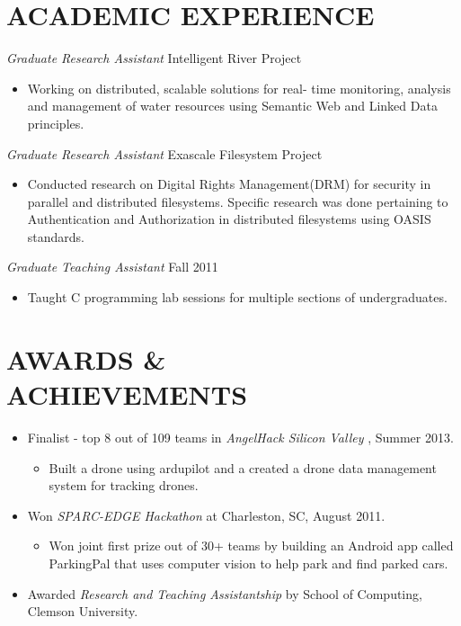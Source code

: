 \documentclass[line,margin]{res}
\begin{document}
\begin{resume}
\section{ACADEMIC EXPERIENCE}  {\sl Graduate Research Assistant} \hfill        Intelligent River\textsuperscript{\textregistered} Project
 					\begin{itemize}  \itemsep -2pt
 					\item Working on distributed, scalable solutions for real- time monitoring, analysis and management of water resources using Semantic Web and Linked Data principles.
					\end{itemize}
					
					{\sl Graduate Research Assistant} \hfill        Exascale Filesystem Project
 					\begin{itemize}  \itemsep -2pt
 					\item Conducted research on Digital Rights Management(DRM) for security in parallel and distributed filesystems. Specific research was done pertaining to Authentication and Authorization in distributed filesystems using OASIS standards.
					\end{itemize}

				  {\sl Graduate Teaching Assistant} \hfill        Fall 2011
 					\begin{itemize}  \itemsep -2pt
 					\item Taught C programming lab sessions for multiple sections of undergraduates.
					\end{itemize}
					

\section{AWARDS \& \\ ACHIEVEMENTS}
			\begin{itemize}  \itemsep -2pt             
            \item Finalist - top 8 out of 109 teams in {\it AngelHack Silicon Valley} , Summer 2013.
            \begin{itemize}  \itemsep -4pt 
            \item Built a drone using ardupilot and a created a drone data management system for tracking drones.
            \end{itemize}
            \item Won {\it SPARC-EDGE Hackathon} at Charleston, SC, August 2011.
            \begin{itemize}  \itemsep -4pt 
            \item Won joint first prize out of 30+ teams by building an Android app called ParkingPal that uses computer vision to help park and find parked cars.
            \end{itemize}
            \item Awarded {\it Research and Teaching Assistantship} by School of Computing, Clemson University.
            \end{itemize}
\end{resume}
\end{document}

